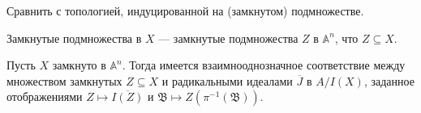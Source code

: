 \documentclass[12pt,a4paper]{article}
\renewcommand{\AA}{\ensuremath{\mathbb{A}}\xspace}
\begin{document}
    \begin{remark*}
        Сравнить с топологией, индуцированной на (замкнутом) подмножестве.
    \end{remark*}

    \begin{remark*}
        Замкнутые подмножества в $X$ --- замкнутые подмножества $Z$ в $\AA^n$, что $Z \subseteq X$.
    \end{remark*}

    \begin{corollary}
        Пусть $X$ замкнуто в $\AA^n$. Тогда имеется взаимнооднозначное соответствие между множеством замкнутых $Z \subseteq X$ и радикальными идеалами $\overline{J}$ в $A/I(X)$, заданное отображениями $Z \mapsto \overline{I(Z)}$ и $\mathfrak{B} \mapsto Z(\pi^{-1}(\mathfrak{B}))$.
    \end{corollary}
\end{document}
